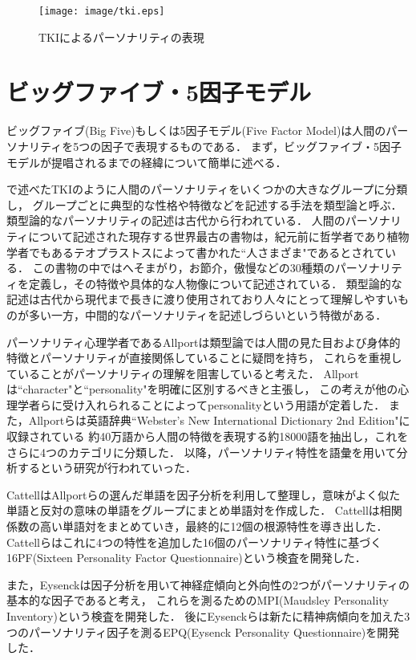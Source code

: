 \begin{figure}[htb]
    \centering
    \texttt{[image: image/tki.eps]}
    \caption{TKIによるパーソナリティの表現}
    \label{fig:tki}
\end{figure}

\section{ビッグファイブ・5因子モデル}
ビッグファイブ(Big Five)もしくは5因子モデル(Five Factor Model)は人間のパーソナリティを5つの因子で表現するものである．
まず，ビッグファイブ・5因子モデルが提唱されるまでの経緯について簡単に述べる\cite{psychology, first-personality, daniel}．

で述べたTKIのように人間のパーソナリティをいくつかの大きなグループに分類し，
グループごとに典型的な性格や特徴などを記述する手法を類型論と呼ぶ．
類型論的なパーソナリティの記述は古代から行われている．
人間のパーソナリティについて記述された現存する世界最古の書物は，紀元前に哲学者であり植物学者でもあるテオプラストスによって書かれた“人さまざま"であるとされている．
この書物の中ではへそまがり，お節介，傲慢などの30種類のパーソナリティを定義し，その特徴や具体的な人物像について記述されている．
類型論的な記述は古代から現代まで長きに渡り使用されており人々にとって理解しやすいものが多い一方，中間的なパーソナリティを記述しづらいという特徴がある．

パーソナリティ心理学者であるAllportは類型論では人間の見た目および身体的特徴とパーソナリティが直接関係していることに疑問を持ち，
これらを重視していることがパーソナリティの理解を阻害していると考えた．
Allportは“character"と“personality"を明確に区別するべきと主張し\cite{allport}，
この考えが他の心理学者らに受け入れられることによってpersonalityという用語が定着した．
また，Allportらは英語辞典“Webster's New International Dictionary 2nd Edition"に収録されている
約40万語から人間の特徴を表現する約18000語を抽出し，これをさらに4つのカテゴリに分類した\cite{allport_odbert}．
以降，パーソナリティ特性を語彙を用いて分析するという研究が行われていった．

CattellはAllportらの選んだ単語を因子分析を利用して整理し，意味がよく似た単語と反対の意味の単語をグループにまとめ単語対を作成した\cite{cattell}．
Cattellは相関係数の高い単語対をまとめていき，最終的に12個の根源特性を導き出した．
Cattellらはこれに4つの特性を追加した16個のパーソナリティ特性に基づく16PF(Sixteen Personality Factor Questionnaire)という検査を開発した\cite{16pf}．

また，Eysenckは因子分析を用いて神経症傾向と外向性の2つがパーソナリティの基本的な因子であると考え，
これらを測るためのMPI(Maudsley Personality Inventory)という検査を開発した\cite{mpi}．
後にEysenckらは新たに精神病傾向を加えた3つのパーソナリティ因子を測るEPQ(Eysenck Personality Questionnaire)を開発した\cite{epq}．


